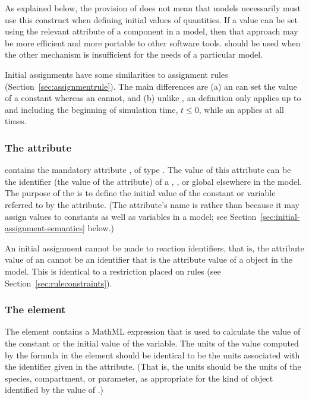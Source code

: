 As explained below, the provision of \InitialAssignment does not
mean that models necessarily must use this construct when defining
initial values of quantities.  If a value can be set
using the relevant attribute of a component in a model, then
that approach may be more efficient and more portable to other
software tools.  \InitialAssignment should be used when the other
mechanism is insufficient for the needs of a particular model.

Initial assignments have some similarities to assignment rules
(Section~\ref{sec:assignmentrule}).  The main differences are (a)
an \InitialAssignment can set the value of a constant whereas an
\AssignmentRule cannot, and (b) unlike \AssignmentRule, an
\InitialAssignment definition only applies up to and including the
beginning of simulation time, \ie $t \leq 0$, while an
\AssignmentRule applies at all times.


\subsubsection{The  attribute}

\InitialAssignment contains the mandatory attribute
, of type .  The value of this
attribute can be the identifier (\ie the value of the 
attribute) of a \Compartment, \Species, \SpeciesReference or
global \Parameter elsewhere in the model.  The purpose of the
\InitialAssignment is to define the initial value of the constant
or variable referred to by the  attribute.  (The
attribute's name is  rather than 
because it may assign values to constants as well as variables in
a model; see Section~\ref{sec:initial-assignment-semantics}
below.)

An initial assignment cannot be made to reaction identifiers, that
is, the  attribute value of an \InitialAssignment cannot
be an identifier that is the  attribute value of a \Reaction
object in the model.  This is identical to a restriction placed on
rules (see Section~\ref{sec:ruleconstraints}).


\subsubsection{The  element}

The  element contains a MathML expression that is used
to calculate the value of the constant or the initial value of the
variable.  The units of the value computed by the formula in the
 element should be identical to be the units associated with the
identifier given in the  attribute.  (That is, the units
should be the units of the species, compartment, or parameter, as
appropriate for the kind of object identified by the value of
.)


